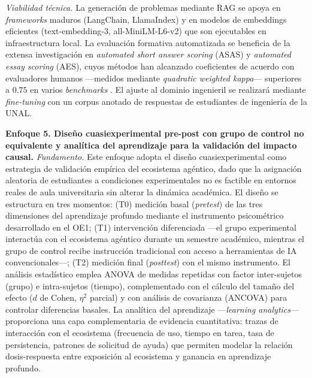 \emph{Viabilidad técnica.}
La generación de problemas mediante RAG se apoya en \emph{frameworks} maduros
(LangChain, LlamaIndex) y en modelos de embeddings eficientes (text-embedding-3,
all-MiniLM-L6-v2) que son ejecutables en infraestructura local. La evaluación
formativa automatizada se beneficia de la extensa investigación en \emph{automated
short answer scoring} (ASAS) y \emph{automated essay scoring} (AES), cuyos métodos
han alcanzado coeficientes de acuerdo con evaluadores humanos —medidos mediante
\emph{quadratic weighted kappa}— superiores a $0.75$ en varios \emph{benchmarks}
\cite{chan2024students}. El ajuste al dominio ingenieril se realizará mediante
\emph{fine-tuning} con un corpus anotado de respuestas de estudiantes de ingeniería
de la UNAL.

\medskip

\noindent\textbf{Enfoque 5. Diseño cuasiexperimental pre-post con grupo de control
no equivalente y analítica del aprendizaje para la validación del impacto causal.}
\emph{Fundamento.}
Este enfoque adopta el diseño cuasiexperimental como estrategia de validación
empírica del ecosistema agéntico, dado que la asignación aleatoria de estudiantes a
condiciones experimentales no es factible en entornos reales de aula universitaria
sin alterar la dinámica académica. El diseño se estructura en tres momentos: (T0)
medición basal (\emph{pretest}) de las tres dimensiones del aprendizaje profundo
mediante el instrumento psicométrico desarrollado en el OE1; (T1) intervención
diferenciada —el grupo experimental interactúa con el ecosistema agéntico durante un
semestre académico, mientras el grupo de control recibe instrucción tradicional con
acceso a herramientas de IA convencionales—; (T2) medición final (\emph{posttest})
con el mismo instrumento. El análisis estadístico emplea ANOVA de medidas repetidas
con factor inter-sujetos (grupo) e intra-sujetos (tiempo), complementado con el
cálculo del tamaño del efecto ($d$ de Cohen, $\eta^2$ parcial) y con análisis de
covarianza (ANCOVA) para controlar diferencias basales. La analítica del aprendizaje
—\emph{learning analytics}— proporciona una capa complementaria de evidencia
cuantitativa: trazas de interacción con el ecosistema (frecuencia de uso, tiempo en
tarea, tasa de persistencia, patrones de solicitud de ayuda) que permiten modelar la
relación dosis-respuesta entre exposición al ecosistema y ganancia en aprendizaje
profundo.


